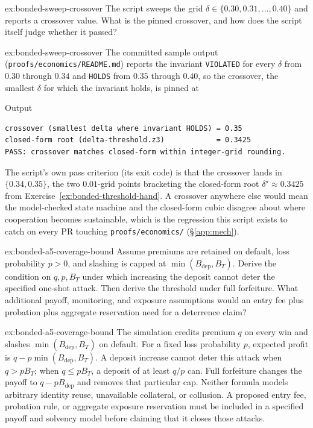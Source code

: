 \documentclass[11pt,a4paper]{article}
\theoremstyle{definition}
\theoremstyle{remark}
\begin{document}
\begin{pdexercise}[kind=Trace,rating=2]{ex:bonded-sweep-crossover}
The script  sweeps the grid $\delta \in \{0.30, 0.31, \ldots, 0.40\}$ and reports a crossover value. What is the pinned crossover, and how does the script itself judge whether it passed?
\end{pdexercise}
\begin{pdsolution}{ex:bonded-sweep-crossover}
The committed sample output (\texttt{proofs/economics/README.md}) reports the invariant \texttt{VIOLATED} for every $\delta$ from $0.30$ through $0.34$ and \texttt{HOLDS} from $0.35$ through $0.40$, so the crossover, the smallest $\delta$ for which the invariant holds, is pinned at
\begin{pdlisting}{Output}{}
\begin{lstlisting}[style=pdoutput]
crossover (smallest delta where invariant HOLDS) = 0.35
closed-form root (delta-threshold.z3)            = 0.3425
PASS: crossover matches closed-form within integer-grid rounding.
\end{lstlisting}
\end{pdlisting}
The script's own pass criterion (its exit code) is that the crossover lands in $\{0.34, 0.35\}$, the two $0.01$-grid points bracketing the closed-form root $\delta^\star\approx0.3425$ from Exercise~\ref{ex:bonded-threshold-hand}. A crossover anywhere else would mean the model-checked state machine and the closed-form cubic disagree about where cooperation becomes sustainable, which is the regression this script exists to catch on every PR touching \texttt{proofs/economics/} (\S\ref{app:mech}).
\end{pdsolution}

\begin{pdexercise}[kind=Trace,rating=2]{ex:bonded-a5-coverage-bound}
Assume premiums are retained on default, loss probability $p>0$, and
slashing is capped at $\min(B_{\mathrm{dep}},B_T)$. Derive the condition on
$q,p,B_T$ under which increasing the deposit cannot deter the specified
one-shot attack. Then derive the threshold under full forfeiture. What
additional payoff, monitoring, and exposure assumptions would an entry
fee plus probation plus aggregate reservation need for a deterrence claim?
\end{pdexercise}
\begin{pdsolution}{ex:bonded-a5-coverage-bound}
The simulation credits premium $q$ on every win and slashes
$\min(B_{\mathrm{dep}},B_T)$ on default. For a fixed loss probability $p$,
expected profit is $q-p\min(B_{\mathrm{dep}},B_T)$. A deposit increase
cannot deter this attack when $q>pB_T$; when $q\le pB_T$, a deposit of
at least $q/p$ can. Full forfeiture changes the payoff to
$q-pB_{\mathrm{dep}}$ and removes that particular cap. Neither formula
models arbitrary identity reuse, unavailable collateral, or collusion.
A proposed entry fee, probation rule, or aggregate exposure reservation
must be included in a specified payoff and solvency model before claiming
that it closes those attacks.
\end{pdsolution}
\end{document}
